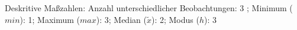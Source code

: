 				\label{tableValues:bocc03_v1}
				\vspace*{-\baselineskip}
                    \begin{noten}
                	    \note{} Deskritive Maßzahlen:
                	    Anzahl unterschiedlicher Beobachtungen: 3%
                	    ; 
                	      Minimum ($min$): 1; 
                	      Maximum ($max$): 3; 
                	      Median ($\tilde{x}$): 2; 
                	      Modus ($h$): 3
                     \end{noten}


